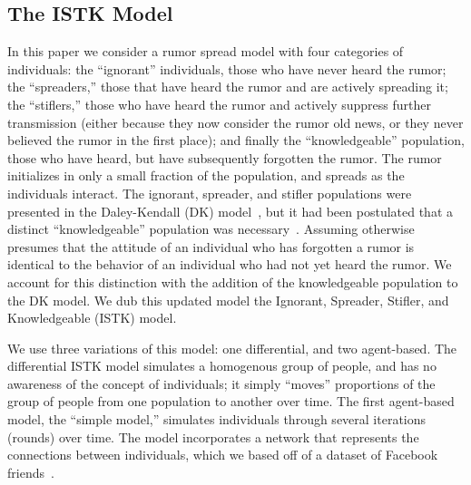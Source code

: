 \subsection{The ISTK Model}
\label{subsec:istk}

In this paper we consider a rumor spread model with four categories of individuals: the ``ignorant'' individuals, those who have never heard the rumor; the ``spreaders,'' those that have heard the rumor and are actively spreading it; the ``stiflers,'' those who have heard the rumor and actively suppress further transmission (either because they now consider the rumor old news, or they never believed the rumor in the first place); and finally the ``knowledgeable'' population, those who have heard, but have subsequently forgotten the rumor.
The rumor initializes in only a small fraction of the population, and spreads as the individuals interact.
The ignorant, spreader, and stifler populations were presented in the Daley-Kendall (DK) model~\cite{daley-1965}, but it had been postulated that a distinct ``knowledgeable'' population was necessary~\cite{zhao-2012, zhao-2011}.
Assuming otherwise presumes that the attitude of an individual who has forgotten a rumor is identical to the behavior of an individual who had not yet heard the rumor.
We account for this distinction with the addition of the knowledgeable population to the DK model.
We dub this updated model the Ignorant, Spreader, Stifler, and Knowledgeable (ISTK) model.

We use three variations of this model: one differential, and two agent-based.
The differential ISTK model simulates a homogenous group of people, and has no awareness of the concept of individuals; it simply ``moves'' proportions of the group of people from one population to another over time.
The first agent-based model, the ``simple model,'' simulates individuals through several iterations (rounds) over time.
The model incorporates a network that represents the connections between individuals, which we based off of a dataset of Facebook friends~\cite{mcauley-2014}.

